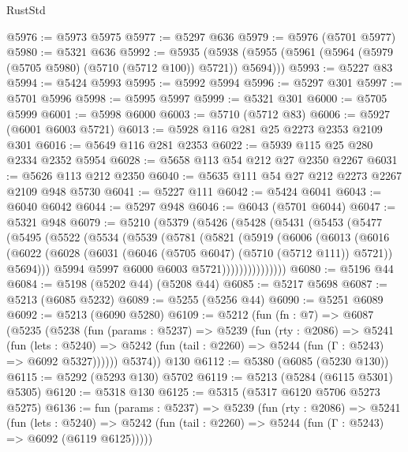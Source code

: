 \begin{lexlean}{RustStd}
\begin{coremodule}
@5976 := @5973 @5975
@5977 := @5297 @636
@5979 := @5976 (@5701 @5977)
@5980 := @5321 @636
@5992 := @5935
    (@5938 (@5955 (@5961 (@5964 (@5979 (@5705 @5980) (@5710 (@5712 @100)) @5721)) @5694)))
@5993 := @5227 @83
@5994 := @5424 @5993
@5995 := @5992 @5994
@5996 := @5297 @301
@5997 := @5701 @5996
@5998 := @5995 @5997
@5999 := @5321 @301
@6000 := @5705 @5999
@6001 := @5998 @6000
@6003 := @5710 (@5712 @83)
@6006 := @5927 (@6001 @6003 @5721)
@6013 := @5928 @116 @281 @25 @2273 @2353 @2109 @301
@6016 := @5649 @116 @281 @2353
@6022 := @5939 @115 @25 @280 @2334 @2352 @5954
@6028 := @5658 @113 @54 @212 @27 @2350 @2267
@6031 := @5626 @113 @212 @2350
@6040 := @5635 @111 @54 @27 @212 @2273 @2267 @2109 @948 @5730
@6041 := @5227 @111
@6042 := @5424 @6041
@6043 := @6040 @6042
@6044 := @5297 @948
@6046 := @6043 (@5701 @6044)
@6047 := @5321 @948
@6079 := @5210
    (@5379
      (@5426
        (@5428
          (@5431
            (@5453
              (@5477
                (@5495
                  (@5522
                    (@5534
                      (@5539
                        (@5781
                          (@5821
                            (@5919
                              (@6006
                                (@6013
                                  (@6016
                                    (@6022
                                      (@6028
                                        (@6031 (@6046 (@5705 @6047) (@5710 (@5712 @111)) @5721))
                                        @5694)))
                                  @5994
                                  @5997
                                  @6000
                                  @6003
                                  @5721)))))))))))))))
@6080 := @5196 @44
@6084 := @5198 (@5202 @44) (@5208 @44)
@6085 := @5217 @5698
@6087 := @5213 (@6085 @5232)
@6089 := @5255 (@5256 @44)
@6090 := @5251 @6089
@6092 := @5213 (@6090 @5280)
@6109 := @5212
    (fun (fn : @7) =>
    @6087
      (@5235
        (@5238
          (fun (params : @5237) =>
          @5239
            (fun (rty : @2086) =>
            @5241
              (fun (lets : @5240) =>
              @5242 (fun (tail : @2260) => @5244 (fun (Γ : @5243) => @6092 @5327))))))
        @5374))
    @130
@6112 := @5380 (@6085 (@5230 @130))
@6115 := @5292 (@5293 @130) @5702
@6119 := @5213 (@5284 (@6115 @5301) @5305)
@6120 := @5318 @130
@6125 := @5315 (@5317 @6120 @5706 @5273 @5275)
@6136 := fun (params : @5237) =>
  @5239
    (fun (rty : @2086) =>
    @5241
      (fun (lets : @5240) =>
      @5242 (fun (tail : @2260) => @5244 (fun (Γ : @5243) => @6092 (@6119 @6125)))))

\end{coremodule}
\end{lexlean}
